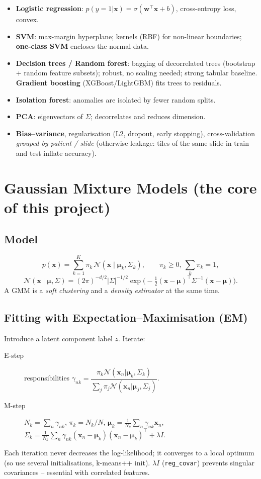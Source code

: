 \begin{itemize}
\item \textbf{Logistic regression}: $p(y{=}1|\mathbf{x})=\sigma(\mathbf{w}^\top\mathbf{x}+b)$, cross-entropy loss, convex.
\item \textbf{SVM}: max-margin hyperplane; kernels (RBF) for non-linear boundaries; \textbf{one-class SVM} encloses the
normal data.
\item \textbf{Decision trees / Random forest}: bagging of decorrelated trees (bootstrap + random feature subsets);
robust, no scaling needed; strong tabular baseline. \textbf{Gradient boosting} (XGBoost/LightGBM) fits trees to residuals.
\item \textbf{Isolation forest}: anomalies are isolated by fewer random splits.
\item \textbf{PCA}: eigenvectors of $\Sigma$; decorrelates and reduces dimension.
\item \textbf{Bias--variance}, regularisation (L2, dropout, early stopping), cross-validation \emph{grouped by patient
/ slide} (otherwise leakage: tiles of the same slide in train and test inflate accuracy).
\end{itemize}

\section{Gaussian Mixture Models (the core of this project)}\label{sec:gmm}
\subsection{Model}
\[ p(\mathbf{x})=\sum_{k=1}^K \pi_k\,\mathcal{N}(\mathbf{x}\mid\bm\mu_k,\Sigma_k),\qquad \pi_k\ge0,\ \textstyle\sum_k\pi_k=1, \]
\[ \mathcal{N}(\mathbf{x}\mid\bm\mu,\Sigma)=(2\pi)^{-d/2}|\Sigma|^{-1/2}\exp\!\big(-\tfrac12(\mathbf{x}-\bm\mu)^\top\Sigma^{-1}(\mathbf{x}-\bm\mu)\big). \]
A GMM is a \emph{soft clustering} and a \emph{density estimator} at the same time.

\subsection{Fitting with Expectation--Maximisation (EM)}
Introduce a latent component label $z$. Iterate:
\begin{description}
\item[E-step] responsibilities $\gamma_{nk}=\dfrac{\pi_k\mathcal{N}(\mathbf{x}_n|\bm\mu_k,\Sigma_k)}{\sum_j\pi_j\mathcal{N}(\mathbf{x}_n|\bm\mu_j,\Sigma_j)}$.
\item[M-step] $N_k=\sum_n\gamma_{nk}$, $\pi_k=N_k/N$, $\bm\mu_k=\frac1{N_k}\sum_n\gamma_{nk}\mathbf{x}_n$,
$\Sigma_k=\frac1{N_k}\sum_n\gamma_{nk}(\mathbf{x}_n-\bm\mu_k)(\mathbf{x}_n-\bm\mu_k)^\top+\lambda I$.
\end{description}
Each iteration never decreases the log-likelihood; it converges to a local optimum (so use several initialisations,
k-means++ init). $\lambda I$ (\texttt{reg\_covar}) prevents singular covariances -- essential with correlated features.

